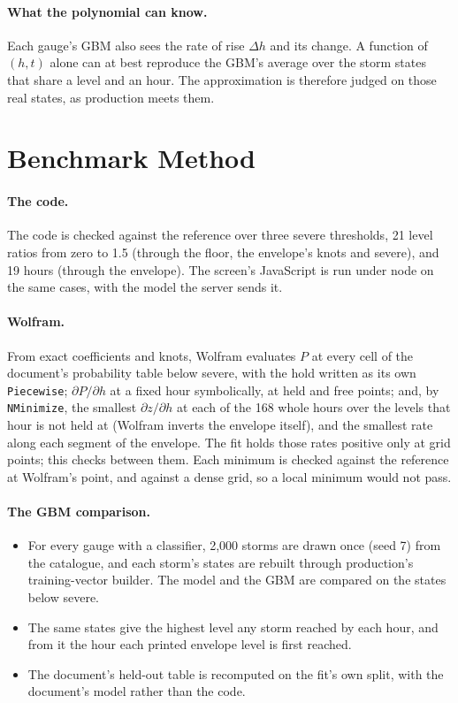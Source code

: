 \documentclass[11pt,a4paper]{article}
\begin{document}
\paragraph{What the polynomial can know.} Each gauge's GBM also sees the rate of rise
$\Delta h$ and its change. A function of $(h,t)$ alone can at best reproduce the GBM's
average over the storm states that share a level and an hour. The approximation is
therefore judged on those real states, as production meets them.

\section{Benchmark Method}

\paragraph{The code.} The code is checked against the reference over three severe
thresholds, 21 level ratios from zero to 1.5 (through the floor, the envelope's knots and
severe), and 19 hours (through the envelope). The screen's JavaScript is run under node
on the same cases, with the model the server sends it.

\paragraph{Wolfram.} From exact coefficients and knots, Wolfram evaluates $P$ at every
cell of the document's probability table below severe, with the hold written as its own
\texttt{Piecewise}; $\partial P/\partial h$ at a fixed hour symbolically, at held and free
points; and, by \texttt{NMinimize}, the smallest $\partial z/\partial h$ at each of the 168
whole hours over the levels that hour is not held at (Wolfram inverts the envelope
itself), and the smallest rate along each segment of the envelope. The fit holds those
rates positive only at grid points; this checks between them. Each minimum is checked
against the reference at Wolfram's point, and against a dense grid, so a local minimum
would not pass.

\paragraph{The GBM comparison.}
\begin{itemize}[leftmargin=*,nosep]
\item For every gauge with a classifier, 2{,}000 storms are drawn once (seed 7) from the
  catalogue, and each storm's states are rebuilt through production's training-vector
  builder. The model and the GBM are compared on the states below severe.
\item The same states give the highest level any storm reached by each hour, and from it
  the hour each printed envelope level is first reached.
\item The document's held-out table is recomputed on the fit's own split, with the
  document's model rather than the code.
\end{itemize}
\end{document}
